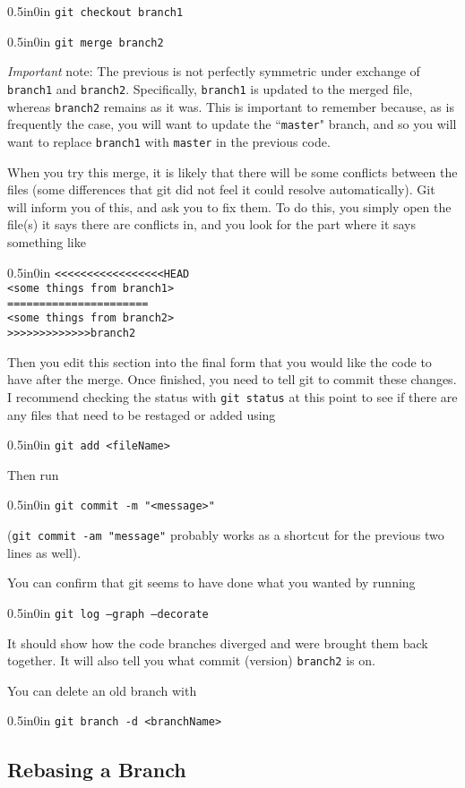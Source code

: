 \documentclass[11pt]{article}
\newcommand{\code}[1]{\begin{adjustwidth}{0.5in}{0in}
    \texttt{#1}
    \end{adjustwidth}}
\begin{document}
\code{git checkout branch1}
\code{git merge branch2}

\emph{Important} note: The previous is not perfectly symmetric under exchange of \texttt{branch1} and \texttt{branch2}.  Specifically, \texttt{branch1} is updated to the merged file, whereas \texttt{branch2} remains as it was.  This is important to remember because, as is frequently the case, you will want to update the ``\texttt{master}" branch, and so you will want to replace \texttt{branch1} with \texttt{master} in the previous code.

When you try this merge, it is likely that there will be some conflicts between the files (some differences that git did not feel it could resolve automatically).  Git will inform you of this, and ask you to fix them.  To do this, you simply open the file(s) it says there are conflicts in, and you look for the part where it says something like

\code{<<<<<<<<<<<<<<<<<HEAD\\
<some things from branch1>\\
======================\\
<some things from branch2>\\
>>>>>>>>>>>>>branch2}

Then you edit this section into the final form that you would like the code to have after the merge.  Once finished, you need to tell git to commit these changes.  I recommend checking the status with \texttt{git status} at this point to see if there are any files that need to be restaged or added using 
\code{git add <fileName>} 

Then run

\code{git commit -m "<message>"}

(\texttt{git commit -am "message"} probably works as a shortcut for the previous two lines as well).  

You can confirm that git seems to have done what you wanted by running 

\code{git log --graph --decorate}

It should show how the code branches diverged and were brought them back together.  It will also tell you what commit (version) \texttt{branch2} is on.

You can delete an old branch with 
\code{git branch -d <branchName>}

\subsection{Rebasing a Branch}
\end{document}
